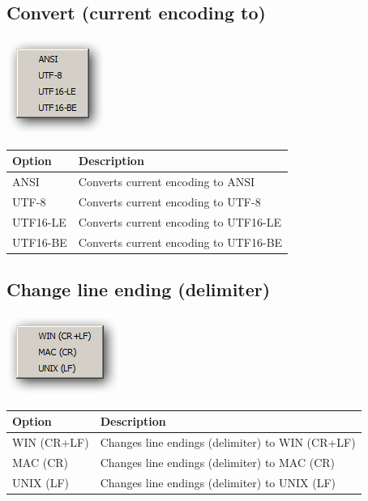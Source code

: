 \hypertarget{menu_encoding_convert}{}
\subsection{Convert (current encoding to)}

\includegraphics[scale=0.50]{./res/menu_encoding_convert.png}\\

\begin{scriptsize}\begin{tabularx}{\textwidth}{>{\hsize=0.3\hsize}X>{\hsize=0.7\hsize}X}\\
    \hline
    \textbf{Option} & \textbf{Description} \\
    \hline
    ANSI & Converts current encoding to ANSI \\
    UTF-8 & Converts current encoding to UTF-8 \\
    UTF16-LE & Converts current encoding to UTF16-LE \\
    UTF16-BE & Converts current encoding to UTF16-BE \\
    \hline
  \end{tabularx}\end{scriptsize}

\hypertarget{menu_encoding_delimiter}{}
\subsection{Change line ending (delimiter)}

\includegraphics[scale=0.50]{./res/menu_encoding_delimiter.png}\\

\begin{scriptsize}\begin{tabularx}{\textwidth}{>{\hsize=0.3\hsize}X>{\hsize=0.7\hsize}X}\\
    \hline
    \textbf{Option} & \textbf{Description} \\
    \hline
    WIN (CR+LF) & Changes line endings (delimiter) to WIN (CR+LF) \\
    MAC (CR) & Changes line endings (delimiter) to MAC (CR) \\
    UNIX (LF) & Changes line endings (delimiter) to UNIX (LF) \\
    \hline
  \end{tabularx}\end{scriptsize}
